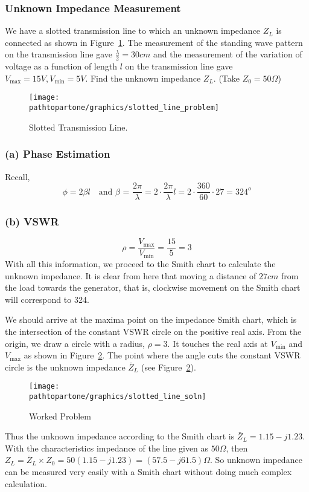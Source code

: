 \begin{exmp}
\subsubsection*{Unknown Impedance Measurement}
We have a slotted transmission line to which an unknown impedance $Z_L$ is connected as shown in Figure~\ref{fig:fig3}. The measurement of the standing wave pattern on the transmission line gave $\frac{\lambda}{2}=30cm$ and the measurement of the variation of voltage as a function of length $l$ on the transmission line gave $V_\max=15V, V_\min=5V$. Find the unknown impedance $Z_L$. (Take $Z_0 = 50\varOmega$)
\begin{figure}[h]
\centering
\texttt{[image: \\pathtopartone/graphics/slotted\_line\_problem]}
\caption{Slotted Transmission Line.}
\label{fig:fig3}
\end{figure}

\subsubsection*{(a) Phase Estimation}
Recall,
\begin{dmath*}
\phi=2\beta l\quad\text{and }\beta\text{ = }\dfrac{2\pi}{\lambda}
=2\cdot\dfrac{2\pi}{\lambda} l
=2\cdot\dfrac{360}{60}\cdot27
=324^{o}
\end{dmath*}
\subsubsection*{(b) VSWR}
\begin{equation*}
\rho=\frac{V_\max}{V_\min}=\frac{15}{5}=3
\end{equation*}
With all this information, we proceed to the Smith chart to calculate the unknown impedance. It is clear from here that moving a distance of $27cm$ from the load towards the generator, that is, clockwise movement on the Smith chart will correspond to 324\textdegree.

We should arrive at the maxima point on the impedance Smith chart, which is the intersection of the constant VSWR circle on the positive real axis. From the origin, we draw a circle with a radius, $\rho = 3$. It touches the real axis at $V_\min$ and $V_\max$ as shown in Figure~\ref{fig:slottedlinesoln}. The point where the angle cuts the constant VSWR circle is the unknown impedance $\bar{Z}_L$ (see Figure~\ref{fig:slottedlinesoln}).
\begin{figure}
\centering
\texttt{[image: \\pathtopartone/graphics/slotted\_line\_soln]}
\caption{Worked Problem}
\label{fig:slottedlinesoln}
\end{figure}

Thus the unknown impedance according to the Smith chart is $\bar{Z}_L=1.15-j1.23$. With the characteristics impedance of the line given as $50\varOmega$, then $Z_{L}=\bar{Z}_L\times Z_0 =50(1.15-j1.23)= (57.5-j61.5) \varOmega$. So unknown impedance can be measured very easily with a Smith chart without doing much complex calculation.
\end{exmp}



